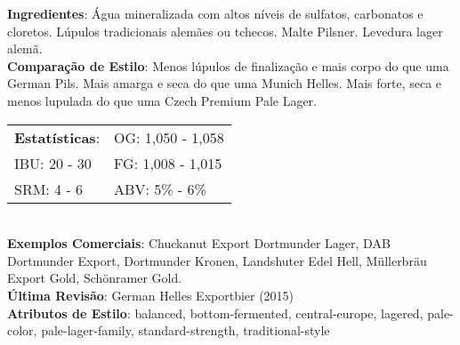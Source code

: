 \textbf{Ingredientes}: Água mineralizada com altos níveis de sulfatos, carbonatos e cloretos. Lúpulos tradicionais alemães ou tchecos. Malte Pilsner. Levedura lager alemã. \\
\textbf{Comparação de Estilo}: Menos lúpulos de finalização e mais corpo do que uma German Pils. Mais amarga e seca do que uma Munich Helles. Mais forte, seca e menos lupulada do que uma Czech Premium Pale Lager. \\
\begin{tabular}{@{}p{35mm}p{35mm}@{}}
  \textbf{Estatísticas}: & OG: 1,050 - 1,058 \\
  IBU: 20 - 30  & FG: 1,008 - 1,015  \\
  SRM: 4 - 6  & ABV: 5\% - 6\%
\end{tabular}\\
\textbf{Exemplos Comerciais}: Chuckanut Export Dortmunder Lager, DAB Dortmunder Export, Dortmunder Kronen, Landshuter Edel Hell, Müllerbräu Export Gold, Schönramer Gold. \\
\textbf{Última Revisão}: German Helles Exportbier (2015) \\
\textbf{Atributos de Estilo}: balanced, bottom-fermented, central-europe, lagered, pale-color, pale-lager-family, standard-strength, traditional-style

